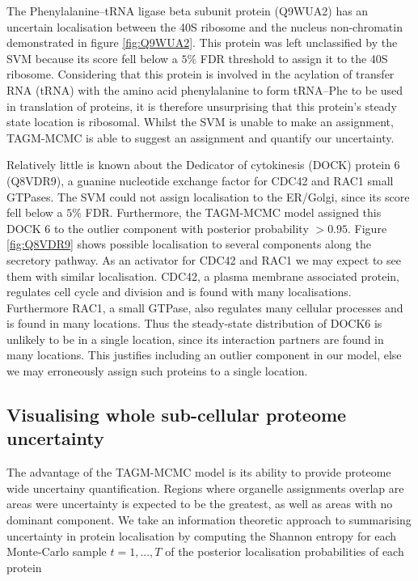 \documentclass[10pt,letterpaper]{article}\usepackage[]{graphicx}\usepackage[]{color}
\begin{document}
The Phenylalanine--tRNA ligase beta subunit protein (Q9WUA2) has an
uncertain localisation between the 40S ribosome and the nucleus
non-chromatin demonstrated in figure \ref{fig:Q9WUA2}. This protein
was left unclassified by the SVM because its score fell below a $5\%$
FDR threshold to assign it to the 40S ribosome. Considering that this
protein is involved in the acylation of transfer RNA (tRNA) with the
amino acid phenylalanine to form tRNA--Phe to be used in translation of
proteins, it is therefore unsurprising that this protein's steady
state location is ribosomal.  Whilst the SVM is unable to make an
assignment, TAGM-MCMC is able to suggest an assignment and quantify our
uncertainty.

Relatively little is known about the Dedicator of cytokinesis (DOCK)
protein 6 (Q8VDR9), a guanine nucleotide exchange factor for CDC42 and
RAC1 small GTPases. The SVM could not assign localisation to the
ER/Golgi, since its score fell below a $5\%$ FDR. Furthermore, the
TAGM-MCMC model assigned this DOCK 6 to the outlier component with
posterior probability $>0.95$.  Figure \ref{fig:Q8VDR9} shows possible
localisation to several components along the secretory pathway. As an
activator for CDC42 and RAC1 we may expect to see them with similar
localisation. CDC42, a plasma membrane associated protein, regulates
cell cycle and division and is found with many
localisations. Furthermore RAC1, a small GTPase, also regulates many
cellular processes and is found in many locations. Thus the
steady-state distribution of DOCK6 is unlikely to be in a single
location, since its interaction partners are found in many
locations. This justifies including an outlier component in our model,
else we may erroneously assign such proteins to a single location.




\subsection*{Visualising whole sub-cellular proteome uncertainty}

The advantage of the TAGM-MCMC model is its ability to provide
proteome wide uncertainy quantification. Regions where organelle
assignments overlap are areas were uncertainty is expected to be the
greatest, as well as areas with no dominant component. We take an
information theoretic approach to summarising uncertainty in protein
localisation by computing the Shannon entropy \cite{shannon:1948} for
each Monte-Carlo sample $t = 1,...,T$ of the posterior localisation
probabilities of each protein
\end{document}
